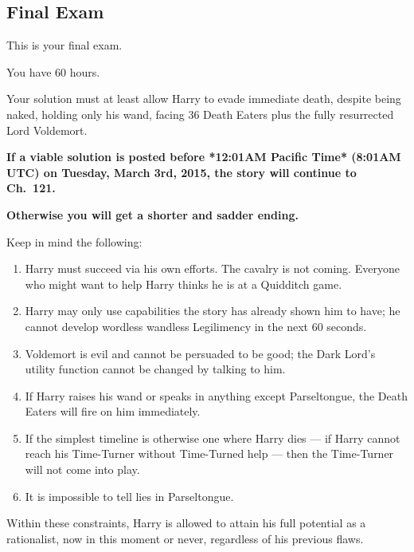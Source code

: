 \subsection{\textbf{Final Exam}}

\noindent
This is your final exam.

\SmallVSpace
\noindent
You have 60 hours.

\SmallVSpace
\noindent
Your solution must at least allow Harry to evade immediate death,
despite being naked, holding only his wand, facing 36 Death Eaters
plus the fully resurrected Lord Voldemort.

\SmallVSpace
\noindent
\textbf{If a viable solution is posted before
*12:01AM Pacific Time* (8:01AM UTC) on Tuesday, March 3rd, 2015,
the story will continue to Ch.~121.}

\SmallVSpace
\noindent
\textbf{Otherwise you will get a shorter and sadder ending.}

\SmallVSpace
\noindent
Keep in mind the following:

\begin{enumerate}
\item Harry must succeed via his own efforts. The cavalry is not coming.
Everyone who might want to help Harry thinks he is at a Quidditch game.

\item Harry may only use capabilities the story has already shown him to
have;
he cannot develop wordless wandless Legilimency in the next 60 seconds.

\item Voldemort is evil and cannot be persuaded to be good;
the Dark Lord's utility function cannot be changed by talking to him.

\item If Harry raises his wand or speaks in anything except Parseltongue,
the Death Eaters will fire on him immediately.

\item If the simplest timeline is otherwise one where Harry dies --- if 
Harry cannot reach his Time-Turner without Time-Turned help --- then 
the Time-Turner will not come into play.

\item It is impossible to tell lies in Parseltongue.
\end{enumerate}

\SmallVSpace
\noindent
Within these constraints,
Harry is allowed to attain his full potential as a rationalist,
now in this moment or never,
regardless of his previous flaws.

